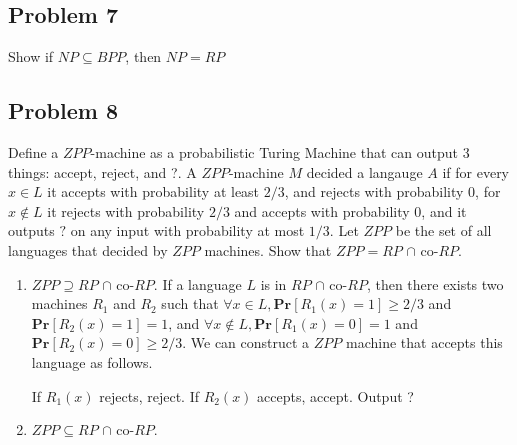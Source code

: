 \documentclass[english]{article}
\begin{document}
\subsection*{Problem 7}
Show if $NP \subseteq BPP$, then $NP = RP$

\subsection*{Problem 8}
Define a $ZPP$-machine as a probabilistic Turing Machine that can output 3 things: accept, reject, and ?.
A $ZPP$-machine $M$ decided a langauge $A$ if for every $x \in L$ it accepts with probability at least $2/3$, and
rejects with probability 0, for $x \notin L$ it rejects with probability $2/3$ and accepts with probability 0, and it
outputs $?$ on any input with probability at most $1/3$. Let $ZPP$ be the set of all languages that decided by
$ZPP$ machines. Show that $ZPP = RP$ $\cap$ co-$RP$.

\begin{enumerate}
  \item $ZPP \supseteq RP$ $\cap$ co-$RP$. 
    If a language $L$ is in $RP$ $\cap$ co-$RP$, then there exists two machines $R_1$ and $R_2$ such that
    $\forall x \in L, \mathbf{Pr}[R_1(x) = 1] \ge 2/3$ and $\mathbf{Pr}[R_2(x) = 1] = 1$,
    and $\forall x \notin L, \mathbf{Pr}[R_1(x) = 0] = 1$ and $\mathbf{Pr}[R_2(x) = 0] \ge 2/3$. We can construct
    a $ZPP$ machine that accepts this language as follows. 

    \begin{algorithmic} %
      \State If $R_1(x)$ rejects, reject.
      \State If $R_2(x)$ accepts, accept.
      \State Output ?
    \EndFunction 
    \end{algorithmic}

  \item $ZPP \subseteq RP$ $\cap$ co-$RP$. 
\end{enumerate}
\end{document}
